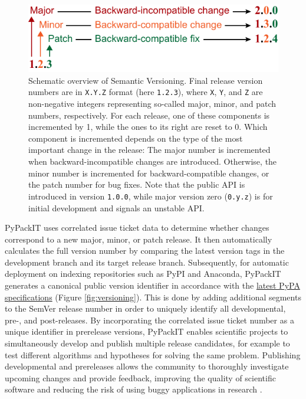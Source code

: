 \documentclass{article}
\begin{document}
\begin{figure}[ht]
    \centering
    \includegraphics[width=0.45\linewidth]{fig_semver.pdf}
    \caption{Schematic overview of Semantic Versioning. Final release version numbers are in \texttt{X.Y.Z} format (here \texttt{1.2.3}), where \texttt{X}, \texttt{Y}, and \texttt{Z} are non-negative integers representing so-called major, minor, and patch numbers, respectively. For each release, one of these components is incremented by 1, while the ones to its right are reset to 0. Which component is incremented depends on the type of the most important change in the release: The major number is incremented when backward-incompatible changes are introduced. Otherwise, the minor number is incremented for backward-compatible changes, or the patch number for bug fixes. Note that the public API is introduced in version \texttt{1.0.0}, while major version zero (\texttt{0.y.z}) is for initial development and signals an unstable API.}
    \label{fig:semver}
\end{figure}

PyPackIT uses correlated issue ticket data to determine whether changes correspond to a new major, minor, or patch release. It then automatically calculates the full version number by comparing the latest version tags in the development branch and its target release branch. Subsequently, for automatic deployment on indexing repositories such as PyPI and Anaconda, PyPackIT generates a canonical public version identifier in accordance with the \href{https://packaging.python.org/en/latest/specifications/version-specifiers/}{latest PyPA specifications} (Figure \ref{fig:versioning}). This is done by adding additional segments to the SemVer release number in order to uniquely identify all developmental, pre-, and post-releases. By incorporating the correlated issue ticket number as a unique identifier in prerelease versions, PyPackIT enables scientific projects to simultaneously develop and publish multiple release candidates, for example to test different algorithms and hypotheses for solving the same problem. Publishing developmental and prereleases allows the community to thoroughly investigate upcoming changes and provide feedback, improving the quality of scientific software and reducing the risk of using buggy applications in research \cite{CICDSystematicReview}.
\end{document}
